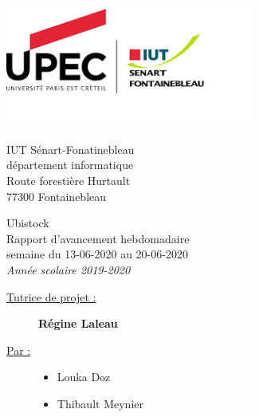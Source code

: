 \documentclass[a4paper, 12pt]{report}
\title{}
\author{
	Louka Doz
	\and 
	Thibault Meynier
}
\date{\raggedleft \today}
\begin{document}
	\makeatletter
	\begin{titlepage}

		\begin{flushleft}
			\begin{minipage}{4cm}
				\includegraphics[height=4cm]{img/logo_iut}
			\end{minipage}
			\hfill
			\begin{minipage}{5cm}
				\begin{flushright}
		        	\small IUT Sénart-Fonatinebleau\\
		        	département informatique\\
		        	Route forestière Hurtault\\
		        	77300 Fontainebleau\\
				\end{flushright}
			\end{minipage}
		\end{flushleft}

		\vfill

		\begin{center}
	        \vspace*{3cm}%
	        {\HUGE Ubistock}\\[0.5cm]
	        {\huge Rapport d'avancement hebdomadaire}\\[0.5cm]
	        {\Large semaine du 13-06-2020 au 20-06-2020}\\[0.5cm]
        	{\large \textit{Année scolaire 2019-2020}}\\[1cm]
	    \end{center}
	    \vfill
        \begin{raggedright}
	        \begin{description}
	        	\item[\large \underline{Tutrice de projet :}] \large \textbf{Régine Laleau}\\[1cm]
	        	\item[\underline{Par :}] 
		        	\begin{itemize}
			        		\item Louka Doz
			        		\item Thibault Meynier
			        \end{itemize}
	        \end{description}
        \end{raggedright}        
	    \let\newpage\relax%
	\end{titlepage}
	\makeatother
\end{document}
